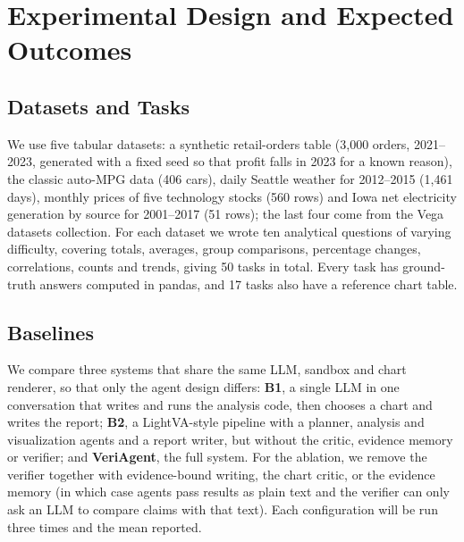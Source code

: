 \documentclass[conference]{IEEEtran}
\begin{document}
\section{Experimental Design and Expected Outcomes}

\subsection{Datasets and Tasks}
We use five tabular datasets: a synthetic retail-orders table (3,000 orders, 2021--2023, generated with a fixed seed so that profit falls in 2023 for a known reason), the classic auto-MPG data (406 cars), daily Seattle weather for 2012--2015 (1,461 days), monthly prices of five technology stocks (560 rows) and Iowa net electricity generation by source for 2001--2017 (51 rows); the last four come from the Vega datasets collection. For each dataset we wrote ten analytical questions of varying difficulty, covering totals, averages, group comparisons, percentage changes, correlations, counts and trends, giving 50 tasks in total. Every task has ground-truth answers computed in pandas, and 17 tasks also have a reference chart table.

\subsection{Baselines}
We compare three systems that share the same LLM, sandbox and chart renderer, so that only the agent design differs: \textbf{B1}, a single LLM in one conversation that writes and runs the analysis code, then chooses a chart and writes the report; \textbf{B2}, a LightVA-style pipeline \cite{zhao2024lightva} with a planner, analysis and visualization agents and a report writer, but without the critic, evidence memory or verifier; and \textbf{VeriAgent}, the full system. For the ablation, we remove the verifier together with evidence-bound writing, the chart critic, or the evidence memory (in which case agents pass results as plain text and the verifier can only ask an LLM to compare claims with that text). Each configuration will be run three times and the mean reported.
\end{document}

